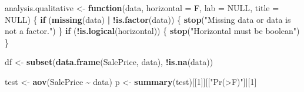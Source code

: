 \documentclass[
]{article}
\newenvironment{Shaded}{\begin{snugshade}}{\end{snugshade}}
\newcommand{\AttributeTok}[1]{\textcolor[rgb]{0.13,0.29,0.53}{#1}}
\newcommand{\ConstantTok}[1]{\textcolor[rgb]{0.56,0.35,0.01}{#1}}
\newcommand{\ControlFlowTok}[1]{\textcolor[rgb]{0.13,0.29,0.53}{\textbf{#1}}}
\newcommand{\DecValTok}[1]{\textcolor[rgb]{0.00,0.00,0.81}{#1}}
\newcommand{\FunctionTok}[1]{\textcolor[rgb]{0.13,0.29,0.53}{\textbf{#1}}}
\newcommand{\NormalTok}[1]{#1}
\newcommand{\OtherTok}[1]{\textcolor[rgb]{0.56,0.35,0.01}{#1}}
\newcommand{\SpecialCharTok}[1]{\textcolor[rgb]{0.81,0.36,0.00}{\textbf{#1}}}
\newcommand{\StringTok}[1]{\textcolor[rgb]{0.31,0.60,0.02}{#1}}
\begin{document}
\begin{Shaded}
\begin{Highlighting}[]
\NormalTok{analysis.qualitative }\OtherTok{\textless{}{-}} \ControlFlowTok{function}\NormalTok{(data, }\AttributeTok{horizontal =}\NormalTok{ F, }\AttributeTok{lab =} \ConstantTok{NULL}\NormalTok{, }\AttributeTok{title =} \ConstantTok{NULL}\NormalTok{) \{}
    \ControlFlowTok{if}\NormalTok{ (}\FunctionTok{missing}\NormalTok{(data) }\SpecialCharTok{|} \SpecialCharTok{!}\FunctionTok{is.factor}\NormalTok{(data)) \{}
        \FunctionTok{stop}\NormalTok{(}\StringTok{"Missing data or data is not a factor."}\NormalTok{)}
\NormalTok{    \}}
    \ControlFlowTok{if}\NormalTok{ (}\SpecialCharTok{!}\FunctionTok{is.logical}\NormalTok{(horizontal)) \{}
        \FunctionTok{stop}\NormalTok{(}\StringTok{"Horizontal must be boolean"}\NormalTok{)}
\NormalTok{    \}}
    
\NormalTok{    df }\OtherTok{\textless{}{-}} \FunctionTok{subset}\NormalTok{(}\FunctionTok{data.frame}\NormalTok{(SalePrice, data), }\SpecialCharTok{!}\FunctionTok{is.na}\NormalTok{(data))}
    
\NormalTok{    test }\OtherTok{\textless{}{-}} \FunctionTok{aov}\NormalTok{(SalePrice }\SpecialCharTok{\textasciitilde{}}\NormalTok{ data)}
\NormalTok{    p }\OtherTok{\textless{}{-}} \FunctionTok{summary}\NormalTok{(test)[[}\DecValTok{1}\NormalTok{]][[}\StringTok{"Pr(\textgreater{}F)"}\NormalTok{]][}\DecValTok{1}\NormalTok{]}
    

\end{Highlighting}
\end{Shaded}
\end{document}
